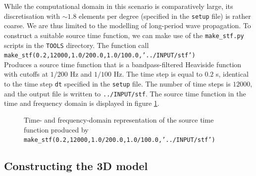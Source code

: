 While the computational domain in this scenario is comparatively large, its discretisation with $\sim 1.8$ elements per degree (specified in the \texttt{setup} file) is rather coarse. We are thus limited to the modelling of long-period wave propagation. To construct a suitable source time function, we can make use of the \texttt{make\_stf.py} scripts in the \texttt{TOOLS} directory. The function call\\[5pt]
\texttt{make\_stf(0.2,12000,1.0/200.0,1.0/100.0,'../INPUT/stf')}\\[5pt]
Produces a source time function that is a bandpass-filtered Heaviside function with cutoffs at $1/200$ Hz and $1/100$ Hz. The time step is equal to $0.2$ s, identical to the time step \texttt{dt} specified in the \texttt{setup} file. The number of time steps is $12000$, and the output file is written to \texttt{../INPUT/stf}. The source time function in the time and frequency domain is displayed in figure \ref{F:stf_NA}.
\begin{center}
\begin{figure}
\center{} 
\caption{Time- and frequency-domain representation of the source time function produced by \texttt{make\_stf(0.2,12000,1.0/200.0,1.0/100.0,'../INPUT/stf')}}\label{F:stf_NA}
\end{figure}
\end{center}


\subsection{Constructing the 3D model}


